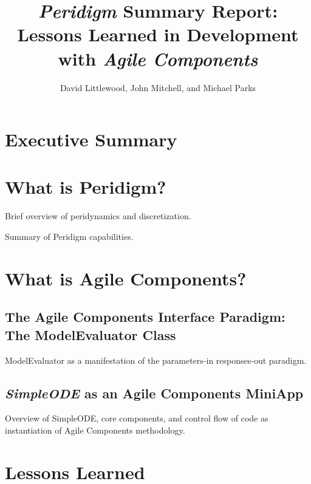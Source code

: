 \documentclass[10pt]{article}
\title{\emph{Peridigm} Summary Report:\\Lessons Learned in Development with \emph{Agile Components}}
\author{David Littlewood, John Mitchell, and Michael Parks}
\theoremstyle{plain}
\theoremstyle{definition}
\theoremstyle{remark}
\numberwithin{equation}{section}
\begin{document}
\maketitle


\section*{Executive Summary} 

\section{What is Peridigm?}

Brief overview of peridynamics and discretization. 

Summary of Peridigm capabilities. 

\section{What is Agile Components?}

\subsection{The Agile Components Interface Paradigm: The ModelEvaluator Class}

ModelEvaluator as a manifestation of the parameters-in responses-out paradigm. 

\subsection{\emph{SimpleODE} as an Agile Components MiniApp}

Overview of SimpleODE, core components, and control flow of code as instantiation of Agile Components methodology. 

\section{Lessons Learned}
\end{document}

